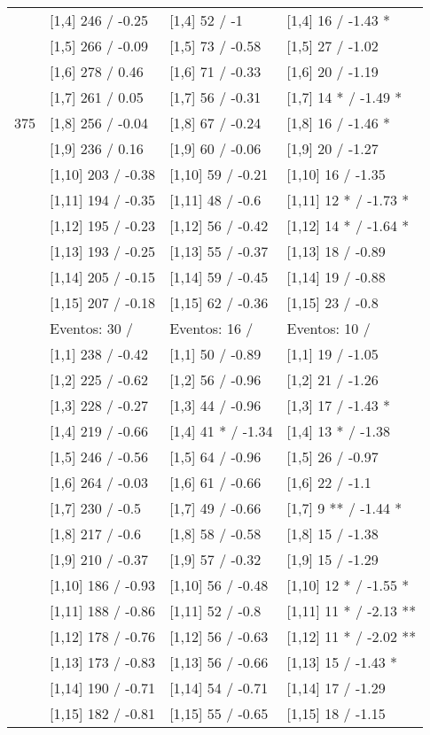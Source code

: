 \begin{table}
\begin{tabular}[t]{llll}
\addlinespace
 & {}[1,4] 246  / -0.25 & {}[1,4] 52  / -1 & {}[1,4] 16  / -1.43 *\\
 & {}[1,5] 266  / -0.09 & {}[1,5] 73  / -0.58 & {}[1,5] 27  / -1.02\\
 & {}[1,6] 278  / 0.46 & {}[1,6] 71  / -0.33 & {}[1,6] 20  / -1.19\\
 & {}[1,7] 261  / 0.05 & {}[1,7] 56  / -0.31 & {}[1,7] 14 * / -1.49 *\\
375 & {}[1,8] 256  / -0.04 & {}[1,8] 67  / -0.24 & {}[1,8] 16  / -1.46 *\\
\addlinespace
 & {}[1,9] 236  / 0.16 & {}[1,9] 60  / -0.06 & {}[1,9] 20  / -1.27\\
 & {}[1,10] 203  / -0.38 & {}[1,10] 59  / -0.21 & {}[1,10] 16  / -1.35\\
 & {}[1,11] 194  / -0.35 & {}[1,11] 48  / -0.6 & {}[1,11] 12 * / -1.73 *\\
 & {}[1,12] 195  / -0.23 & {}[1,12] 56  / -0.42 & {}[1,12] 14 * / -1.64 *\\
 & {}[1,13] 193  / -0.25 & {}[1,13] 55  / -0.37 & {}[1,13] 18  / -0.89\\
\addlinespace
 & {}[1,14] 205  / -0.15 & {}[1,14] 59  / -0.45 & {}[1,14] 19  / -0.88\\
 & {}[1,15] 207  / -0.18 & {}[1,15] 62  / -0.36 & {}[1,15] 23  / -0.8\\
 & Eventos:  30 / & Eventos:  16 / & Eventos:  10 /\\
 & {}[1,1] 238  / -0.42 & {}[1,1] 50  / -0.89 & {}[1,1] 19  / -1.05\\
 & {}[1,2] 225  / -0.62 & {}[1,2] 56  / -0.96 & {}[1,2] 21  / -1.26\\
\addlinespace
 & {}[1,3] 228  / -0.27 & {}[1,3] 44  / -0.96 & {}[1,3] 17  / -1.43 *\\
 & {}[1,4] 219  / -0.66 & {}[1,4] 41 * / -1.34 & {}[1,4] 13 * / -1.38\\
 & {}[1,5] 246  / -0.56 & {}[1,5] 64  / -0.96 & {}[1,5] 26  / -0.97\\
 & {}[1,6] 264  / -0.03 & {}[1,6] 61  / -0.66 & {}[1,6] 22  / -1.1\\
 & {}[1,7] 230  / -0.5 & {}[1,7] 49  / -0.66 & {}[1,7] 9 ** / -1.44 *\\
\addlinespace
500 & {}[1,8] 217  / -0.6 & {}[1,8] 58  / -0.58 & {}[1,8] 15  / -1.38\\
 & {}[1,9] 210  / -0.37 & {}[1,9] 57  / -0.32 & {}[1,9] 15  / -1.29\\
 & {}[1,10] 186  / -0.93 & {}[1,10] 56  / -0.48 & {}[1,10] 12 * / -1.55 *\\
 & {}[1,11] 188  / -0.86 & {}[1,11] 52  / -0.8 & {}[1,11] 11 * / -2.13 **\\
 & {}[1,12] 178  / -0.76 & {}[1,12] 56  / -0.63 & {}[1,12] 11 * / -2.02 **\\
\addlinespace
 & {}[1,13] 173  / -0.83 & {}[1,13] 56  / -0.66 & {}[1,13] 15  / -1.43 *\\
 & {}[1,14] 190  / -0.71 & {}[1,14] 54  / -0.71 & {}[1,14] 17  / -1.29\\
 & {}[1,15] 182  / -0.81 & {}[1,15] 55  / -0.65 & {}[1,15] 18  / -1.15\\
\bottomrule
\end{tabular}
\end{table}
